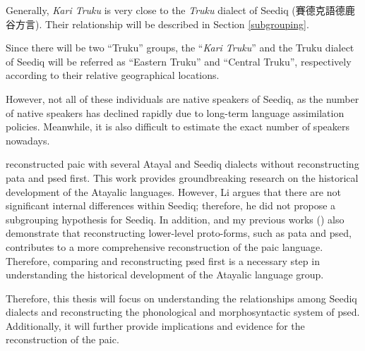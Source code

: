 Generally, \textit{Kari Truku} is very close to the \textit{Truku} dialect of Seediq (賽德克語德鹿谷方言). Their relationship will be described in Section \ref{subgrouping}. 

Since there will be two ``Truku'' groups, the ``\textit{Kari Truku}'' and the Truku dialect of Seediq will be referred as ``Eastern Truku'' and ``Central Truku'', respectively according to their relative geographical locations.

 However, not all of these individuals are native speakers of Seediq, as the number of native speakers has declined rapidly due to long-term language assimilation policies. Meanwhile, it is also difficult to estimate the exact number of speakers nowadays.

\textcite{li1981paic} reconstructed \ac{paic} with several Atayal and Seediq dialects without reconstructing \ac{pata} and \ac{psed} first. This work provides groundbreaking research on the historical development of the Atayalic languages. However, Li argues that there are not significant internal differences within Seediq; therefore, he did not propose a subgrouping hypothesis for Seediq. In addition, \textcite{goderich2020phd} and my previous works (\cite{song2022Aicd,song2023Aicgprime}) also demonstrate that reconstructing lower-level proto-forms, such as \acl{pata} and \acl{psed}, contributes to a more comprehensive reconstruction of the \acl{paic} language. Therefore, comparing and reconstructing \acl{psed} first is a necessary step in understanding the historical development of the Atayalic language group.

Therefore, this thesis will focus on understanding the relationships among Seediq dialects and reconstructing the phonological and morphosyntactic system of \acl{psed}. Additionally, it will further provide implications and evidence for the reconstruction of the \acl{paic}.


